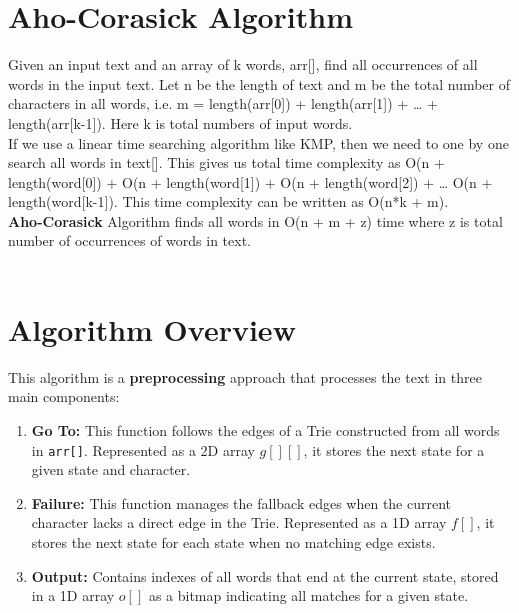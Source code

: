 \documentclass[11pt,a4paper]{article}
\begin{document}
\section{Aho-Corasick Algorithm}
Given an input text and an array of k words, arr[], find all occurrences of all words in the input text. Let n be the length of text and m be the total number of characters in all words, i.e. m = length(arr[0]) + length(arr[1]) + … + length(arr[k-1]). Here k is total numbers of input words.
\\
If we use a linear time searching algorithm like KMP, then we need to one by one search all words in text[]. This gives us total time complexity as O(n + length(word[0]) + O(n + length(word[1]) + O(n + length(word[2]) + … O(n + length(word[k-1]). This time complexity can be written as O(n*k + m). 
\\
\textbf{Aho-Corasick} Algorithm finds all words in O(n + m + z) time where z is total number of occurrences of words in text. 
\\
\\
\section*{Algorithm Overview}

This algorithm is a \textbf{preprocessing} approach that processes the text in three main components:

\begin{enumerate}
    \item \textbf{Go To:}  
    This function follows the edges of a Trie constructed from all words in \texttt{arr[]}. Represented as a 2D array $g[][]$, it stores the next state for a given state and character.
    
    \item \textbf{Failure:}  
    This function manages the fallback edges when the current character lacks a direct edge in the Trie. Represented as a 1D array $f[]$, it stores the next state for each state when no matching edge exists.

    \item \textbf{Output:}  
    Contains indexes of all words that end at the current state, stored in a 1D array $o[]$ as a bitmap indicating all matches for a given state.
\end{enumerate}
\end{document}

